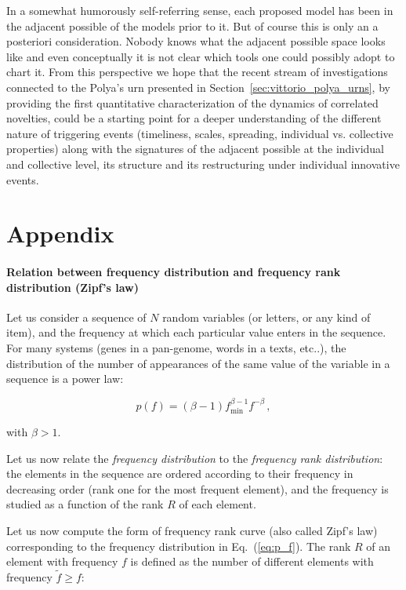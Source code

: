 \documentclass[graybox]{svmult}
\newcommand{\Eq}[1]{Eq.~(\ref{#1})}
\begin{document}
In a somewhat humorously self-referring sense, each proposed model has been in the adjacent possible of the models prior to it. But of course this is only an a posteriori consideration. Nobody knows what the adjacent possible space looks like and even conceptually it is not clear which tools one could possibly adopt to chart it. From this perspective we hope that the recent stream of investigations connected to the Polya's urn presented in Section~\ref{sec:vittorio_polya_urns}, by providing the first quantitative characterization of the dynamics of correlated novelties, could be a starting point for a deeper understanding of the different nature of triggering events (timeliness, scales, spreading, individual vs. collective properties) along with the signatures of the adjacent possible at the individual and collective level, its structure and its restructuring under individual innovative events.

\section{Appendix}
\label{sec:fra_zipf_heaps}
\newcommand{\balpha}{\beta}%
\newcommand{\abeta}{\alpha}%
%
\paragraph{\textbf{Relation between frequency distribution and frequency rank distribution (Zipf's law)}}

Let us consider a sequence of $N$ random variables (or letters, or any kind of item),  
and the frequency at which each particular value enters in the sequence. For many systems (genes in a pan-genome, words in a texts, etc..), the distribution of the number of appearances of the same value of the variable in a sequence is a power law:


\begin{equation}\label{eq:p_f}
p(f) =(\balpha -1) f_{\min}^{\balpha-1} f^{-\balpha} \,,
\end{equation}

\noindent with $\balpha > 1$.

Let us now relate the {\em frequency distribution} to the {\em frequency rank distribution}:
the elements in the sequence are ordered according to their frequency in decreasing order (rank one for the most frequent element), and the frequency is studied as a function of the rank $R$ of each element.

Let us now compute the form of frequency rank curve (also called Zipf's law) corresponding to the frequency distribution in \Eq{eq:p_f}.
The rank $R$ of an element with frequency $f$ is defined as the number of different elements with frequency $\tilde{f} \geq f$:
\end{document}
